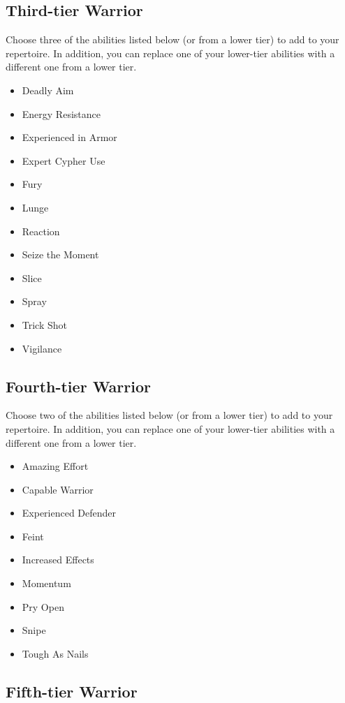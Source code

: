 \subsection{Third-tier Warrior}

Choose three of the abilities listed below (or from a lower tier) to add to your repertoire. In addition, you can replace one of your lower-tier abilities with a different one from a lower tier.

\begin{itemize}
\item Deadly Aim
\item Energy Resistance
\item Experienced in Armor
\item Expert Cypher Use
\item Fury
\item Lunge
\item Reaction
\item Seize the Moment
\item Slice
\item Spray
\item Trick Shot
\item Vigilance
\end{itemize}

\subsection{Fourth-tier Warrior}

Choose two of the abilities listed below (or from a lower tier) to add to your repertoire. In addition, you can replace one of your lower-tier abilities with a different one from a lower tier.

\begin{itemize}
\item Amazing Effort
\item Capable Warrior
\item Experienced Defender
\item Feint
\item Increased Effects
\item Momentum
\item Pry Open
\item Snipe
\item Tough As Nails
\end{itemize}

\subsection{Fifth-tier Warrior}

